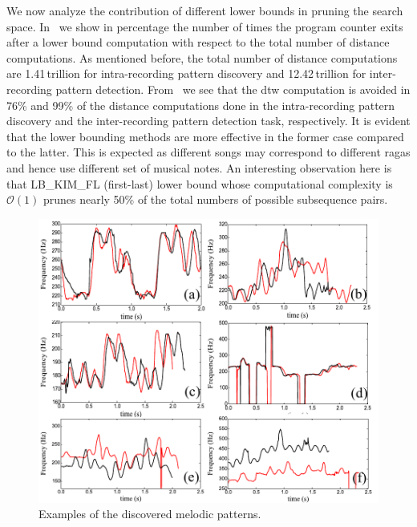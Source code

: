 We now analyze the contribution of different lower bounds in pruning the search space. In~ we show in percentage the number of times the program counter exits after a lower bound computation with respect to the total number of distance computations. As mentioned before, the total number of distance computations are 1.41\,trillion for intra-recording pattern discovery and 12.42\,trillion for inter-recording pattern detection. From~ we see that the \gls{dtw} computation is avoided in 76\% and 99\% of the distance computations done in the intra-recording pattern discovery and the inter-recording pattern detection task, respectively. It is evident that the lower bounding methods are more effective in the former case compared to the latter. This is expected as different songs may correspond to different \glspl{raga} and hence use different set of musical notes. An interesting observation here is that LB\_KIM\_FL (first-last) lower bound whose computational complexity is $\mathcal{O}(1)$ prunes nearly 50\% of the total numbers of possible subsequence pairs. 

\begin{figure}
	\begin{center}
		\includegraphics[width=\figSizeHundred]{ch06_patterns/figures/discovery/combinedPatterns.pdf}
	\end{center}
	\caption{Examples of the discovered melodic patterns.}
	\label{fig:combinedPatternsDiscovered}
\end{figure}

